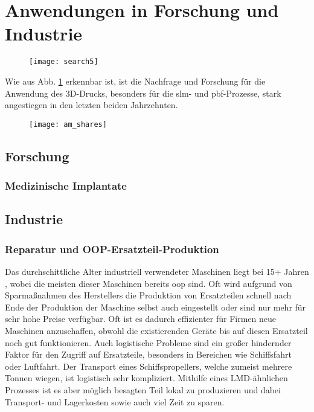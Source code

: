 \documentclass[../main.tex]{subfiles}
\begin{document}
\section{Anwendungen in Forschung und Industrie}
\begin{figure}[H]
	\centering
	\texttt{[image: search5]}
	\label{img:search_5}
\end{figure}
Wie aus Abb. \ref{img:search_5} erkennbar ist, ist die Nachfrage und Forschung für die Anwendung des 3D-Drucks, besonders für die \acrlong{slm}- und \acrfull{pbf}-Prozesse, stark angestiegen in den letzten beiden Jahrzehnten.

\begin{figure}[H]
	\centering
	\texttt{[image: am\_shares]}
	\label{img:am_shares}
\end{figure} 
\subsection{Forschung}
\subsubsection{Medizinische Implantate}
\subsection{Industrie}
\subsubsection{Reparatur und OOP-Ersatzteil-Produktion}
Das durchschittliche Alter industriell verwendeter Maschinen liegt bei 15+ Jahren \parencite{lifespan_1}, wobei die meisten dieser Maschinen bereits \acrfull{oop} sind. 
Oft wird aufgrund von Sparmaßnahmen des Herstellers die Produktion von Ersatzteilen schnell nach Ende der Produktion der Maschine selbst auch eingestellt oder sind nur mehr für sehr hohe Preise verfügbar. 
Oft ist es dadurch effizienter für Firmen neue Maschinen anzuschaffen, obwohl die existierenden Geräte bis auf diesen Ersatzteil noch gut funktionieren. 
Auch logistische Probleme sind ein großer hindernder Faktor für den Zugriff auf Ersatzteile, besonders in Bereichen wie Schiffsfahrt oder Luftfahrt. Der Transport eines Schiffspropellers, welche zumeist mehrere Tonnen wiegen, ist logistisch sehr kompliziert. 
Mithilfe eines LMD-ähnlichen Prozesses ist es aber möglich besagten Teil lokal zu produzieren \parencite{ship_1} und dabei Transport- und Lagerkosten sowie auch viel Zeit zu sparen. 
\end{document}
